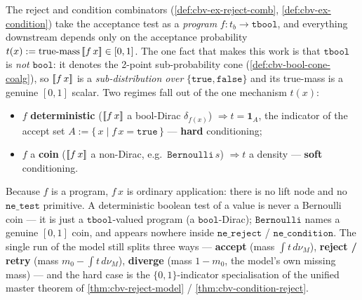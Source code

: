 The reject and condition combinators (\autoref{def:cbv-ex-reject-comb},
\autoref{def:cbv-ex-condition}) take the acceptance test as a
\emph{program} $f : t_b \to \mathtt{tbool}$, and everything downstream
depends only on the acceptance probability
$t(x) := \mathrm{true\text{-}mass}\,[\![ f\,x ]\!] \in [0, 1]$. The one fact
that makes this work is that $\mathtt{tbool}$ is \emph{not}
$\mathtt{bool}$: it denotes the 2-point sub-probability cone
(\autoref{def:cbv-bool-cone-coalg}), so $[\![ f\,x ]\!]$ is a
\emph{sub-distribution over} $\{\mathtt{true}, \mathtt{false}\}$ and its
true-mass is a genuine $[0,1]$ scalar. Two regimes fall out of the one
mechanism $t(x)$:
\begin{itemize}
  \item $f$ \textbf{deterministic} ($[\![ f\,x ]\!]$ a bool-Dirac
    $\delta_{f(x)}$) $\Rightarrow t = \mathbf 1_A$, the indicator of the
    accept set $A := \{\,x \mid f\,x = \mathtt{true}\,\}$ ---
    \textbf{hard} conditioning;
  \item $f$ a \textbf{coin} ($[\![ f\,x ]\!]$ a non-Dirac, e.g.\
    $\mathtt{Bernoulli}\,s$) $\Rightarrow t$ a density ---
    \textbf{soft} conditioning.
\end{itemize}
Because $f$ is a program, $f\,x$ is ordinary application: there is no
lift node and no $\mathtt{ne\_test}$ primitive. A deterministic boolean
test of a value is never a Bernoulli coin --- it is just a
$\mathtt{tbool}$-valued program (a $\mathtt{bool}$-Dirac); $\mathtt{Bernoulli}$
names a genuine $[0,1]$ coin, and appears nowhere inside
$\mathtt{ne\_reject}$ / $\mathtt{ne\_condition}$. The single run of the
model still splits three ways --- \textbf{accept} (mass
$\int t\,d\nu_M$), \textbf{reject / retry} (mass
$m_0 - \int t\,d\nu_M$), \textbf{diverge} (mass $1 - m_0$, the model's
own missing mass) --- and the hard case is the $\{0,1\}$-indicator
specialisation of the unified master theorem of
\autoref{thm:cbv-reject-model} / \autoref{thm:cbv-condition-reject}.

